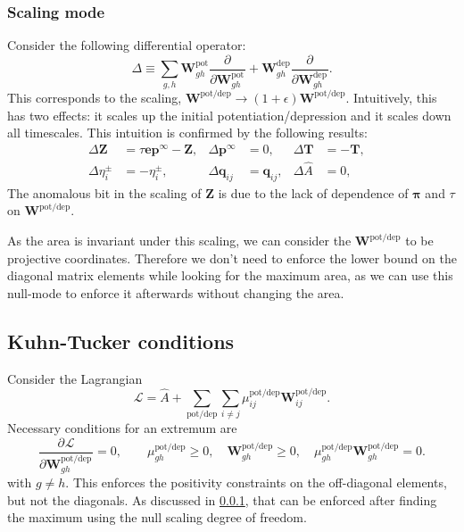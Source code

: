 \documentclass[9pt,twocolumn,twoside,lineno]{pnas-new}
\newcommand{\pdiff}[3][]{\frac{\partial^{#1} #2}{\partial {#3}^{#1}}}
\newcommand{\CL}{\mathcal{L}}
\newcommand{\onev}{\mathbf{e}}
\newcommand{\prob}{\mathbf{p}}
\newcommand{\eq}{\prob^\infty}
\newcommand{\fpt}{\mathbf{T}}
\newcommand{\fund}{\mathbf{Z}}
\newcommand{\pib}{\boldsymbol{\pi}}
\newcommand{\w}{\mathbf{w}}
\newcommand{\W}{\mathbf{W}}
\newcommand{\enc}{\mathbf{q}}
\newcommand{\pot}{^{\text{pot}}}
\newcommand{\dep}{^{\text{dep}}}
\newcommand{\potdep}{^{\text{pot/dep}}}
\begin{document}
\begin{strip}
\subsubsection{Scaling mode}\label{sec:rescale}

Consider the following differential operator:
%
\begin{equation}\label{eq:scaleop}
  \Delta \equiv \sum_{g,h} \W\pot _{gh}\pdiff{}{\W\pot _{gh}} + \W\dep _{gh}\pdiff{}{\W\dep _{gh}}.
\end{equation}
%
This corresponds to the scaling, $\W\potdep  \to (1+\epsilon)\W\potdep $.
Intuitively, this has two effects: it scales up the initial potentiation/depression and it scales down all timescales.
This intuition is confirmed by the following results:
%
\begin{equation}\label{eq:scaleeffects}
  \begin{aligned}
    \Delta \fund &= \tau\onev\eq - \fund ,&
    \Delta \eq  &= 0 ,&
    \Delta \fpt  &= -\fpt ,
    \\
    \Delta \eta^\pm_i  &= - \eta^\pm_i ,&
    \Delta \enc_{ij} &= \enc_{ij} ,&
    \Delta \hat{A}  &= 0 ,&
  \end{aligned}
\end{equation}
%
The anomalous bit in the scaling of $\fund$ is due to the lack of dependence of $\pib$ and $\tau$ on $\W\potdep $.

As the area is invariant under this scaling, we can consider the $\W\potdep $ to be projective coordinates.
Therefore we don't need to enforce the lower bound on the diagonal matrix elements while looking for the maximum area, as we can use this null-mode to enforce it afterwards without changing the area.

\subsection{Kuhn-Tucker conditions}\label{sec:kuhntucker}

Consider the Lagrangian
%
\begin{equation}\label{eq:lagrangian}
  \CL = \hat{A} + \sum_{\text{pot/dep}}\sum_{i\neq j} \mu\potdep _{ij} \W\potdep _{ij} .%
\end{equation}
%
Necessary conditions for an extremum are
%
\begin{equation}\label{eq:extremum}
  \pdiff{\CL}{\W\potdep _{gh}} = 0,
  \qquad
    \mu\potdep _{gh} \geq 0,\quad
    \W\potdep _{gh} \geq 0,\quad
    \mu\potdep _{gh}\W\potdep _{gh} = 0.
\end{equation}
%
with $g \neq h$. This enforces the positivity constraints on the off-diagonal elements, but not the diagonals. As discussed in \cref{sec:rescale}, that can be enforced after finding the maximum using the null scaling degree of freedom.


\end{strip}
\end{document}
